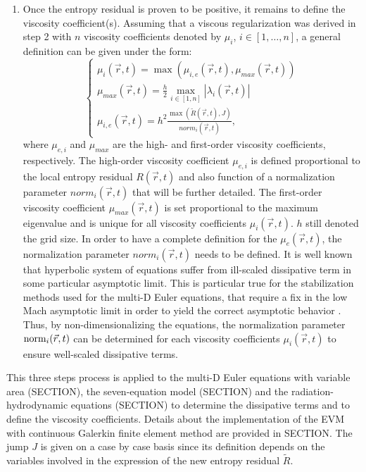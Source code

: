 \begin{enumerate}
\item Once the entropy residual is proven to be positive, it remains to define the viscosity coefficient(s). Assuming that a viscous regularization was derived in step 2 with $n$ viscosity coefficients denoted by $\mu_i$, $i\in \left[1, \dots, n\right]$, a general definition can be given under the form:
%
\begin{equation}
\left\{
\begin{array}{l}
\mu_i(\vec{r},t) = \max \left( \mu_{i,e}(\vec{r},t), \mu_{max}(\vec{r},t) \right) \nonumber \\
\mu_{max}(\vec{r},t) = \frac{h}{2} \max_{i\in \left[1,n\right]} |\lambda_i(\vec{r},t)| \nonumber \\
\mu_{i,e}(\vec{r},t) = h^2 \frac{\max\left(\tilde{R}(\vec{r},t), J\right)}{norm_i(\vec{r},t)}, \nonumber
\end{array}
\right.
\end{equation}
%
where $\mu_{e,i}$ and $\mu_{max}$ are the high- and first-order viscosity coefficients, respectively. The high-order viscosity coefficient $\mu_{e,i}$ is defined proportional to the local entropy residual $R(\vec{r},t)$ and also function of a normalization parameter $norm_i(\vec{r},t)$ that will be further detailed. The first-order viscosity coefficient $\mu_{max}(\vec{r},t)$ is set proportional to the maximum eigenvalue and is unique for all viscosity coefficients $\mu_i(\vec{r},t)$. $h$ still denoted the grid size. In order to have a complete definition for the $\mu_e(\vec{r},t)$, the normalization parameter $norm_i(\vec{r},t)$ needs to be defined. It is well known that hyperbolic system of equations suffer from ill-scaled dissipative term in some particular asymptotic limit. This is particular true for the stabilization methods used for the multi-D Euler equations, that require a fix in the low Mach asymptotic limit in order to yield the correct asymptotic behavior \cite{LowMach1, LowMach2}. Thus, by non-dimensionalizing the equations, the normalization parameter $\textrm{norm}_i(\vec{r},t)$ can be determined for each viscosity coefficients $\mu_i(\vec{r},t)$ to ensure well-scaled dissipative terms. 
\end{enumerate}
This three steps process is applied to the multi-D Euler equations with variable area (SECTION), the seven-equation model (SECTION) and the radiation-hydrodynamic equations (SECTION) to determine the dissipative terms and to define the viscosity coefficients. Details about the implementation of the EVM with continuous Galerkin finite element method are provided in SECTION. The jump $J$ is given on a case by case basis since its definition depends on the variables involved in the expression of the new entropy residual $\tilde{R}$.
